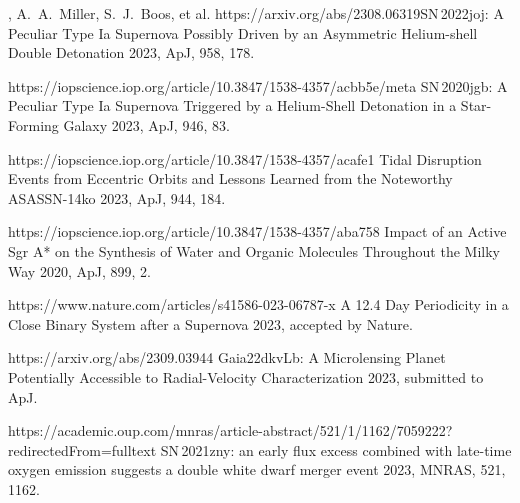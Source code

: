 


\begin{cvpubs}


\cvpub
{ %
\begin{cvitems}
    \item \cvsubpub
    {\Cliu, A.~A.~Miller, S.~J.~Boos, et al.}
    {}
    {https://arxiv.org/abs/2308.06319}{SN\,2022joj: A Peculiar Type Ia Supernova Possibly Driven by an Asymmetric Helium-shell Double Detonation}
    {2023, ApJ, 958, 178.}
    \item {}
    {}
    {https://iopscience.iop.org/article/10.3847/1538-4357/acbb5e/meta}
    {SN\,2020jgb: A Peculiar Type Ia Supernova Triggered by a Helium-Shell Detonation in a Star-Forming Galaxy}
    {2023, ApJ, 946, 83.}
    \item {}
    {}
    {https://iopscience.iop.org/article/10.3847/1538-4357/acafe1}
    {Tidal Disruption Events from Eccentric Orbits and Lessons Learned from the Noteworthy ASASSN-14ko}
    {2023, ApJ, 944, 184.}
    \item {}
    {}
    {https://iopscience.iop.org/article/10.3847/1538-4357/aba758}
    {Impact of an Active Sgr A* on the Synthesis of Water and Organic Molecules Throughout the Milky Way}
    {2020, ApJ, 899, 2.}
    \item {} 
    {\Cliu}
    {https://www.nature.com/articles/s41586-023-06787-x}
    {A 12.4 Day Periodicity in a Close Binary System after a Supernova}
    {2023, accepted by Nature.}
    \item {} 
    {\Cliu}
    {https://arxiv.org/abs/2309.03944}
    {Gaia22dkvLb: A Microlensing Planet Potentially Accessible to Radial-Velocity Characterization}
    {2023, submitted to ApJ.}
    \item {} 
    {\Cliu}
    {https://academic.oup.com/mnras/article-abstract/521/1/1162/7059222?redirectedFrom=fulltext}
    {SN\,2021zny: an early flux excess combined with late-time oxygen emission suggests a double white dwarf merger event}
    {2023, MNRAS, 521, 1162.}
\end{cvitems}
}


\end{cvpubs}


